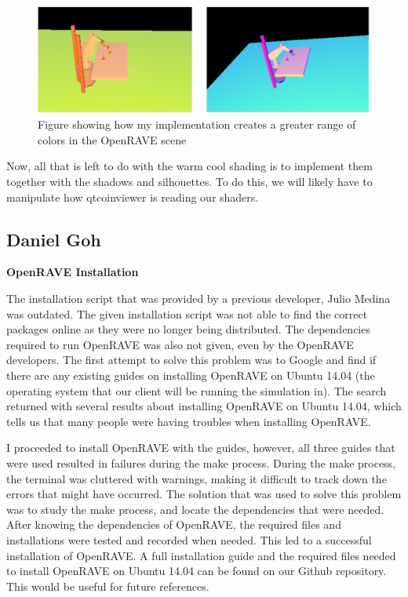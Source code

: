 \documentclass[10pt,journal,compsoc,draftclsnofoot]{IEEEtran}
\begin{document}
\begin{flushleft}
\begin{figure} [H]
  \includegraphics[scale=0.8]{Warmcool.eps}
  \caption
{ \newline \hspace{\linewidth}
Figure showing how my implementation creates a greater range of colors in the OpenRAVE scene}
  \label{fig:Warmcool}
\end{figure}

Now, all that is left to do with the warm cool shading is to implement them together with the shadows and silhouettes.
To do this, we will likely have to manipulate how qtcoinviewer is reading our shaders.

\newpage

\subsection{Daniel Goh}
\textbf{OpenRAVE Installation}
\par
The installation script that was provided by a previous developer, Julio Medina was outdated.
The given installation script was not able to find the correct packages online as they were no longer being distributed.
The dependencies required to run OpenRAVE was also not given, even by the OpenRAVE developers.
The first attempt to solve this problem was to Google and find if there are any existing guides on installing OpenRAVE on Ubuntu 14.04 (the operating system that our client will be running the simulation in).
The search returned with several results about installing OpenRAVE on Ubuntu 14.04, which tells us that many people were having troubles when installing OpenRAVE.
\par
I proceeded to install OpenRAVE with the guides, however, all three guides that were used resulted in failures during the make process.
During the make process, the terminal was cluttered with warnings, making it difficult to track down the errors that might have occurred.
The solution that was used to solve this problem was to study the make process, and locate the dependencies that were needed.
After knowing the dependencies of OpenRAVE, the required files and installations were tested and recorded when needed.
This led to a successful installation of OpenRAVE.
A full installation guide and the required files needed to install OpenRAVE on Ubuntu 14.04 can be found on our Github repository.
This would be useful for future references.


\end{flushleft}
\end{document}
